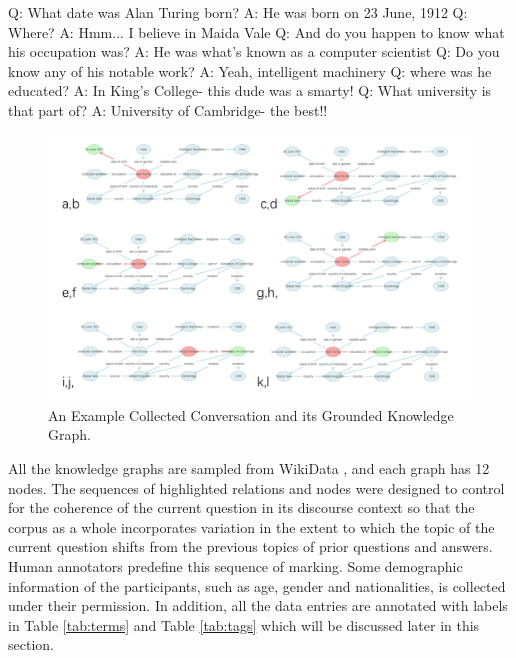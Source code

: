 \documentclass[bsc,frontabs,twoside,singlespacing,parskip,deptreport]{infthesis}     %
\begin{document}
\begin{exe}
	\ex
		\begin{xlist}
			\ex \label{qq1} Q: What date was Alan Turing born?
			\ex \label{aa1} A: He was born on 23 June, 1912
			\ex \label{qq2} Q: Where?
			\ex \label{aa2} A: Hmm... I believe in Maida Vale
			\ex \label{qq3} Q: And do you happen to know what his occupation was?
			\ex \label{aa3} A: He was what's known as a computer scientist
			\ex \label{qq4} Q: Do you know any of his notable work?
			\ex \label{aa4} A: Yeah, intelligent machinery
			\ex \label{qq5} Q: where was he educated?
			\ex \label{aa5} A: In King's College- this dude was a smarty!
			\ex \label{qq6} Q: What university is that part of?
			\ex \label{aa6} A: University of Cambridge- the best!!
\end{xlist}
\end{exe}


\begin{figure}[h]
    \centering
    \includegraphics[width=\textwidth]{graphs.png}
    \caption{An Example Collected Conversation and its Grounded Knowledge Graph.}
    \label{fig:exampledata}
\end{figure}

All the knowledge graphs are sampled from WikiData \cite{vrandevcic2014wikidata}, and each graph has 12 nodes. The sequences of highlighted relations and nodes were designed to control for the coherence of the current question in its discourse context so that the corpus as a whole incorporates variation in the extent to which the topic of the current question shifts from the previous topics of prior questions and answers. Human annotators predefine this sequence of marking. Some demographic information of the participants, such as age, gender and nationalities, is collected under their permission. In addition, all the data entries are annotated with labels in Table \ref{tab:terms} and Table \ref{tab:tags} which will be discussed later in this section.
\end{document}
